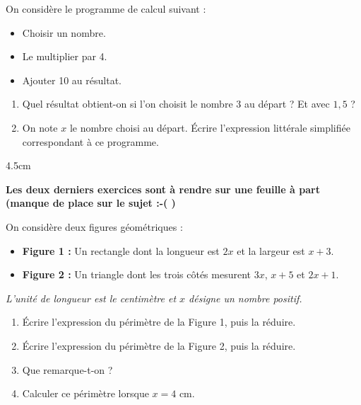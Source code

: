 \documentclass[a4paper]{book}
\begin{document}
{   
\newpage

    
    \begin{exercice} 
        On considère le programme de calcul suivant :
        \begin{itemize}
            \item Choisir un nombre.
            \item Le multiplier par 4.
            \item Ajouter 10 au résultat.
        \end{itemize}
        \begin{enumerate}
            \item Quel résultat obtient-on si l'on choisit le nombre $3$ au départ ? Et avec $1,5$ ?
            \item On note $x$ le nombre choisi au départ. Écrire l'expression littérale simplifiée correspondant à ce programme.
        \end{enumerate}
        \begin{ZoneReponse}{4.5cm} 
        \end{ZoneReponse}
    \end{exercice}


    \textbf{Les deux derniers exercices sont à rendre sur une feuille à part (manque de place sur le sujet :-( )}

   
    \begin{exercice}
        On considère deux figures géométriques :
        \begin{itemize}
            \item \textbf{Figure 1 :} Un rectangle dont la longueur est $2x$ et la largeur est $x + 3$.
            \item \textbf{Figure 2 :} Un triangle dont les trois côtés mesurent $3x$, $x + 5$ et $2x + 1$.
        \end{itemize}
        \textit{L'unité de longueur est le centimètre et $x$ désigne un nombre positif.}
        
        \begin{enumerate}
            \item Écrire l'expression du périmètre de la Figure 1, puis la réduire.
            \item Écrire l'expression du périmètre de la Figure 2, puis la réduire.
            \item Que remarque-t-on ?
            \item Calculer ce périmètre lorsque $x = 4$ cm.
        \end{enumerate}
    \end{exercice}
    
}
\end{document}
